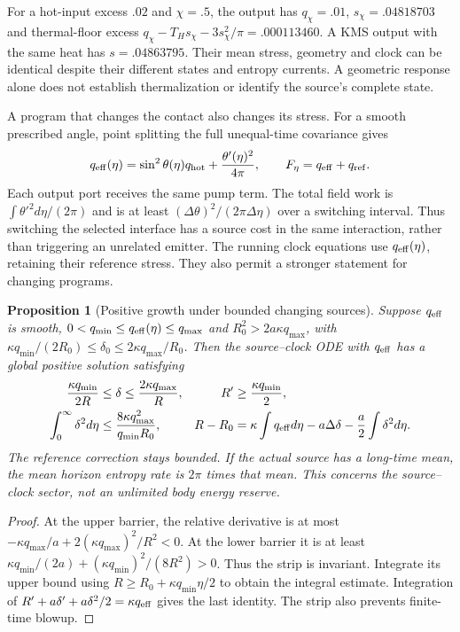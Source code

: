 \documentclass[12pt,a4paper]{article}
\newtheorem{proposition}[theorem]{Proposition}
\begin{document}
For a hot-input excess $.02$ and $\chi=.5$, the output has
$q_\chi=.01$, $s_\chi=.04818703$ and thermal-floor excess
$q_\chi-T_Hs_\chi-3s_\chi^2/\pi=.000113460$.
A KMS output with the same heat has $s=.04863795$.
Their mean stress, geometry and clock can be identical despite their
different states and entropy currents. A geometric response alone does
not establish thermalization or identify the source's complete state.

A program that changes the contact also changes its stress. For a
smooth prescribed angle, point splitting the full unequal-time
covariance gives
\begin{equation}\label{eq:local-source-pump}
 q_{\rm eff}(\eta)=\sin^2\theta(\eta)q_{\rm hot}
                  +\frac{\theta'(\eta)^2}{4\pi},\qquad
 F_\eta=q_{\rm eff}+q_{\rm ref}.
\end{equation}
Each output port receives the same pump term. The total field work is
$\int\theta'^2d\eta/(2\pi)$ and is at least
$(\Delta\theta)^2/(2\pi\Delta\eta)$ over a switching interval.
Thus switching the selected interface has a source cost in the same
interaction, rather than triggering an unrelated emitter. The running
clock equations use $q_{\rm eff}(\eta)$, retaining their reference
stress. They also permit a stronger statement for changing programs.

\begin{proposition}[Positive growth under bounded changing sources]
\label{prop:changing-source-clock}
Suppose $q_{\rm eff}$ is smooth,
$0<q_{\min}\le q_{\rm eff}(\eta)\le q_{\max}$ and
$R_0^2>2a\kappa q_{\max}$, with
$\kappa q_{\min}/(2R_0)\le\delta_0\le2\kappa q_{\max}/R_0$.
Then the source--clock ODE with $q_{\rm eff}$ has a global positive
solution satisfying
\begin{align}\label{eq:changing-source-growth}
 \frac{\kappa q_{\min}}{2R}&\le\delta\le
                 \frac{2\kappa q_{\max}}R,&
 R'&\ge\frac{\kappa q_{\min}}2,\nonumber\\
 \int_0^\infty\delta^2d\eta&\le
       \frac{8\kappa q_{\max}^2}{q_{\min}R_0},&
 R-R_0&=\kappa\int q_{\rm eff}d\eta
             -a\Delta\delta-\frac a2\int\delta^2d\eta.
\end{align}
The reference correction stays bounded. If the actual source has a
long-time mean, the mean horizon entropy rate is $2\pi$ times that
mean. This concerns the source--clock sector, not an unlimited body
energy reserve.
\end{proposition}
\begin{proof}
At the upper barrier, the relative derivative is at most
$-\kappa q_{\max}/a+2(\kappa q_{\max})^2/R^2<0$.
At the lower barrier it is at least
$\kappa q_{\min}/(2a)+(\kappa q_{\min})^2/(8R^2)>0$.
Thus the strip is invariant. Integrate its upper bound using
$R\ge R_0+\kappa q_{\min}\eta/2$ to obtain the integral estimate.
Integration of $R'+a\delta'+a\delta^2/2=\kappa q_{\rm eff}$ gives
the last identity. The strip also prevents finite-time blowup.
\end{proof}
\end{document}
